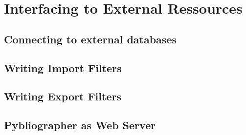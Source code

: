 
\section{Interfacing to  External Ressources}
\label{sec:external}


\subsection{Connecting to external databases}
\label{sec:extconn}


\subsection{Writing Import Filters}
\label{sec:importfilter}


\subsection{Writing Export Filters}
\label{sec:exportfilter}


\subsection{Pybliographer as Web Server }
\label{sec:pybweb}




